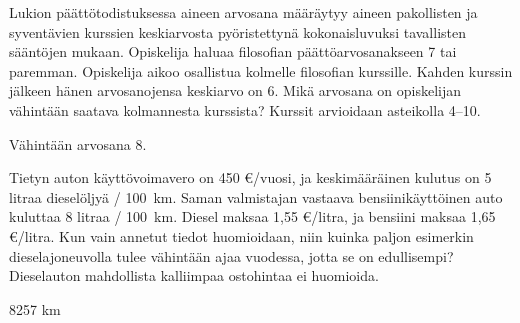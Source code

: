 \begin{tehtavasivu}
\begin{tehtava}
Lukion päättötodistuksessa aineen arvosana määräytyy aineen pakollisten ja syventävien kurssien keskiarvosta pyöristettynä kokonaisluvuksi tavallisten 
sääntöjen mukaan. Opiskelija haluaa filosofian päättöarvosanakseen 7 tai paremman. Opiskelija aikoo osallistua kolmelle filosofian kurssille. Kahden 
kurssin jälkeen hänen arvosanojensa keskiarvo on 6. Mikä arvosana on opiskelijan vähintään saatava kolmannesta kurssista? Kurssit arvioidaan asteikolla 
4--10.
\begin{vastaus}
Vähintään arvosana 8.
\end{vastaus}
\end{tehtava}

\begin{tehtava}
	Tietyn auton käyttövoimavero on 450 \euro /vuosi, ja keskimääräinen kulutus on 5 litraa dieselöljyä / 100~km. Saman valmistajan vastaava bensiinikäyttöinen auto kuluttaa 8 litraa / 100~km. Diesel maksaa 1,55 \euro /litra, ja bensiini maksaa 1,65 \euro /litra. Kun vain annetut tiedot huomioidaan, niin kuinka paljon esimerkin dieselajoneuvolla tulee vähintään ajaa vuodessa, jotta se on edullisempi? Dieselauton mahdollista kalliimpaa ostohintaa ei huomioida.
    \begin{vastaus}
        8257 km
    \end{vastaus}
\end{tehtava}

\end{tehtavasivu}

